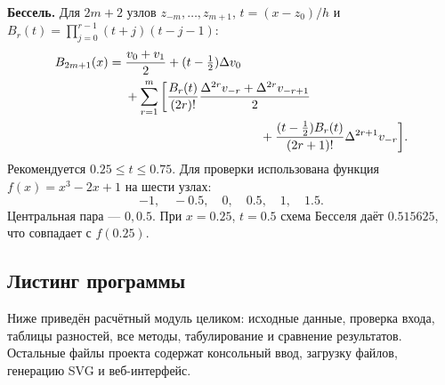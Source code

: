\documentclass[12pt,a4paper]{article}
\begin{document}
\textbf{Бессель.} Для $2m+2$ узлов $z_{-m},\ldots,z_{m+1}$,
$t=(x-z_0)/h$ и $B_r(t)=\prod_{j=0}^{r-1}(t+j)(t-j-1)$:
\begin{align*}
B_{2m+1}(x)={}&\frac{v_0+v_1}{2}+(t-\tfrac12)\Delta v_0\\
&+\sum_{r=1}^{m}\bigg[\frac{B_r(t)}{(2r)!}
\frac{\Delta^{2r}v_{-r}+\Delta^{2r}v_{-r+1}}{2}\\
&\hspace{3.8cm}+\frac{(t-\tfrac12)B_r(t)}{(2r+1)!}\Delta^{2r+1}v_{-r}\bigg].
\end{align*}
Рекомендуется $0.25\le t\le0.75$. Для проверки использована функция
$f(x)=x^3-2x+1$ на шести узлах:
\[
-1,\quad -0.5,\quad 0,\quad 0.5,\quad 1,\quad 1.5.
\]
Центральная пара --- $0,0.5$.
При $x=0.25$, $t=0.5$ схема Бесселя даёт $0.515625$, что совпадает с $f(0.25)$.

\clearpage
\subsection{Листинг программы}
Ниже приведён расчётный модуль целиком: исходные данные, проверка входа,
таблицы разностей, все методы, табулирование и сравнение результатов.
Остальные файлы проекта содержат консольный ввод, загрузку файлов,
генерацию SVG и веб-интерфейс.

\end{document}
